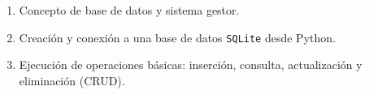 \begin{enumerate}
  \begin{enumerate}
    \item \label{itm:7.1} Concepto de base de datos y sistema gestor.
    \item \label{itm:7.2} Creación y conexión a una base de datos \texttt{SQLite} desde Python.
    \item \label{itm:7.3} Ejecución de operaciones básicas: inserción, consulta, actualización y eliminación (CRUD).
  \end{enumerate}

\end{enumerate}


